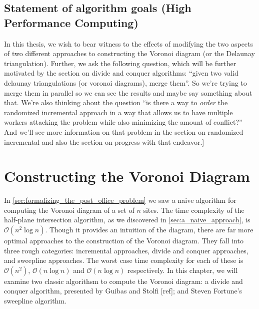 \documentclass[12pt,twoside]{reedthesis}
\begin{document}
  \section{Statement of algorithm goals (High Performance Computing)} %
  \label{sec:statement_of_algorithm_goals_high_performance_computing_}
    In this thesis, we wish to bear witness to the effects of modifying the two aspects of two different approaches to constructing the Voronoi diagram (or the Delaunay triangulation). Further, we ask the following question, which will be further motivated by the section on divide and conquer algorithms: ``given two valid delaunay triangulations (or voronoi diagrams), merge them''. So we're trying to merge them in parallel so we can see the results and maybe say something about that. We're also thinking about the question ``is there a way to \emph{order} the randomized incremental approach in a way that allows us to have multiple workers attacking the problem while also minimizing the amount of conflict?'' And we'll see more information on that problem in the section on randomized incremental and also the section on progress with that endeavor.]

  \chapter*{Constructing the Voronoi Diagram}
    \setcounter{chapter}{3}
    \setcounter{section}{0}
  In \cref{sec:formalizing_the_post_office_problem} we saw a naive algorithm for computing the Voronoi diagram of a set of $n$ sites. The time complexity of the half-plane intersection algorithm, as we discovered in \cref{sec:a_naive_approach}, is $\mathcal{O}(n^{2}\log n)$. Though it provides an intuition of the diagram, there are far more optimal approaches to the construction of the Voronoi diagram. They fall into three rough categories: incremental approaches, divide and conquer approaches, and sweepline approaches. The worst case time complexity for each of these is $\mathcal{O}(n^{2})$, $\mathcal{O}(n\log n)$ and $\mathcal{O}(n\log n)$ respectively. In this chapter, we will examine two classic algorithsm to compute the Voronoi diagram: a divide and conquer algorithm, presented by Guibas and Stolfi [ref]; and Steven Fortune's sweepline algorithm. \par
  
\end{document}
